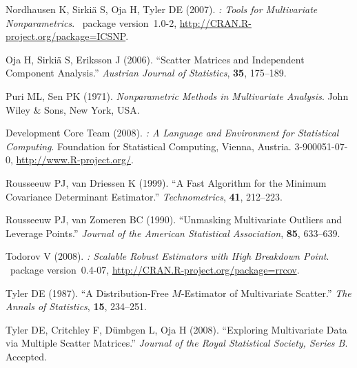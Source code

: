 \documentclass[article,nojss]{jss}
\begin{document}
\begin{thebibliography}{33}
Nordhausen K, Sirki{\"a} S, Oja H, Tyler DE (2007).
\newblock \emph{: Tools for Multivariate Nonparametrics}.
\newblock {}~package version~1.0-2,
  \urlprefix\url{http://CRAN.R-project.org/package=ICSNP}.

Oja H, Sirki{\"a} S, Eriksson J (2006).
\newblock \enquote{Scatter Matrices and Independent Component Analysis.}
\newblock \emph{Austrian Journal of Statistics}, \textbf{35}, 175--189.

Puri ML, Sen PK (1971).
\newblock \emph{Nonparametric Methods in Multivariate Analysis}.
\newblock John Wiley \& Sons, New York, USA.

{ Development Core Team} (2008).
\newblock \emph{: A Language and Environment for Statistical
  Computing}.
\newblock {} Foundation for Statistical Computing, Vienna, Austria.
 3-900051-07-0, \urlprefix\url{http://www.R-project.org/}.

Rousseeuw PJ, van Driessen K (1999).
\newblock \enquote{A Fast Algorithm for the Minimum Covariance Determinant
  Estimator.}
\newblock \emph{Technometrics}, \textbf{41}, 212--223.

Rousseeuw PJ, van Zomeren BC (1990).
\newblock \enquote{Unmasking Multivariate Outliers and Leverage Points.}
\newblock \emph{Journal of the American Statistical Association}, \textbf{85},
  633--639.

Todorov V (2008).
\newblock \emph{: Scalable Robust Estimators with High Breakdown
  Point}.
\newblock {}~package version~0.4-07,
  \urlprefix\url{http://CRAN.R-project.org/package=rrcov}.

Tyler DE (1987).
\newblock \enquote{A Distribution-Free {$M$}-Estimator of Multivariate
  Scatter.}
\newblock \emph{The Annals of Statistics}, \textbf{15}, 234--251.

Tyler DE, Critchley F, D{\"u}mbgen L, Oja H (2008).
\newblock \enquote{Exploring Multivariate Data via Multiple Scatter Matrices.}
\newblock \emph{Journal of the Royal Statistical Society, Series B}.
\newblock Accepted.


\end{thebibliography}
\end{document}
